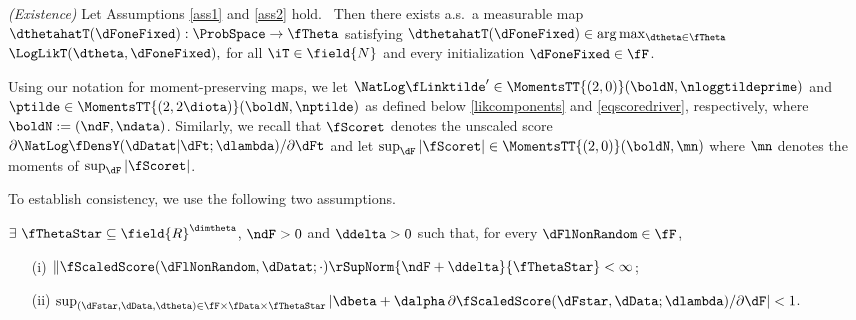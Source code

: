 
\begin{theo} \label{theo1}
\emph{(Existence)} Let Assumptions \ref{ass1} and \ref{ass2} hold.
\ Then there exists a.s.~a measurable map 
$\dthetahatT(\dFoneFixed):\ProbSpace \to \fTheta$ satisfying 
$\dthetahatT(\dFoneFixed) \in \arg\max_{\dtheta \in \fTheta} $ $\LogLikT(\dtheta,\dFoneFixed),$
for all $\iT \in \field{N}$ and every initialization $\dFoneFixed \in \fF$.
\end{theo}






%
Using our notation for moment-preserving maps, we let $\NatLog \fLinktilde' \in \MomentsTT{(2,0)}(\boldN,\nloggtildeprime)$ and $\ptilde \in \MomentsTT{(2,2\diota)}(\boldN,\nptilde)$  as defined below \eqref{likcomponents} and \eqref{eqscoredriver}, respectively, where $\boldN:=(\ndF,\ndata)$.
Similarly, we recall that $\fScoret$ denotes the unscaled score $\partial \NatLog \fDensY(\dDatat| \dFt; \dlambda)/\partial \dFt$ and let $\sup_{\dF}|\fScoret| \in \MomentsTT{(2,0)}(\boldN,\mn)$ where $\mn$ denotes the moments of $\sup_{\dF}|\fScoret|$.

To establish consistency, we use the following two assumptions. 

\begin{ass}
\label{ass3}
$\exists \ \fThetaStar \subseteq \field{R}^{\dimtheta} $, $\ndF >0$ and $\ddelta>0$ such that, for every %
$\dFlNonRandom \in \fF$,
\begin{enumerate}
    \item[(i)] $ \| \fScaledScore(\dFlNonRandom,\dDatat; \cdot) \rSupNorm{\ndF+\ddelta}{\fThetaStar}<\infty$;
    \item[(ii)] $\sup_{(\dFstar,\dData,\dtheta) \in \fF \times \fData \times \fThetaStar} 
    |\dbeta + \dalpha \, \partial \fScaledScore(\dFstar,\dData;\dlambda)/\partial\dF|
    <1$.
\end{enumerate}
\end{ass}

